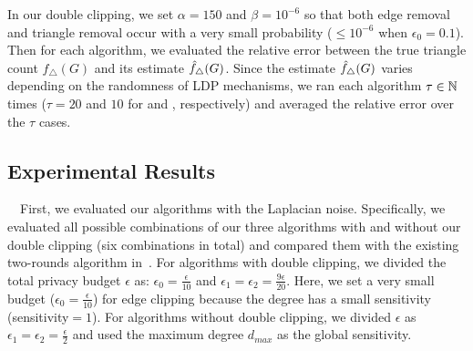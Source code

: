 In our double clipping, we set $\alpha = 150$ and $\beta = 10^{-6}$ so that both edge removal and triangle removal occur with a very small probability ($\leq 10^{-6}$ when $\epsilon_0 = 0.1$). 
Then for each algorithm, we evaluated the relative error between the true triangle count $f_\triangle(G)$ and its estimate $\hat{f}_\triangle(G)$. 
Since the estimate $\hat{f}_\triangle(G)$ varies depending on the randomness of LDP mechanisms, we ran each algorithm $\tau \in \mathbb{N}$ times ($\tau=20$ and $10$ for \GPlus{} and \IMDB{}, respectively) and averaged the relative error over the $\tau$ cases.

\subsection{Experimental Results}
\label{chap2-sub:results}

\smallskip
~~First, 
we 
evaluated our algorithms with the Laplacian noise. 
Specifically, we evaluated all possible combinations of our three algorithms with and without our double clipping (six combinations in total) and compared them with 
the existing two-rounds algorithm in~\cite{Imola_USENIX21}.  
For algorithms with double clipping, we divided the total privacy budget $\epsilon$ as: 
$\epsilon_0 = \frac{\epsilon}{10}$ and 
$\epsilon_1 = \epsilon_2 = \frac{9\epsilon}{20}$. 
Here, we set a very small budget ($\epsilon_0 = \frac{\epsilon}{10}$) for edge clipping because the degree has a small sensitivity (sensitivity$=1$). 
For algorithms without double clipping, we divided $\epsilon$ as $\epsilon_1 = \epsilon_2 = \frac{\epsilon}{2}$ and 
used the maximum degree $d_{max}$ as the global sensitivity. 

